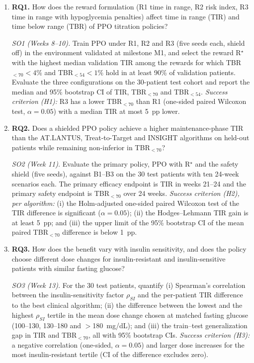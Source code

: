 \documentclass[conference]{IEEEtran}
\begin{document}
\begin{enumerate}[label=\arabic*)]
\item \textbf{RQ1.} How does the reward formulation (R1 time in range, R2 risk index, R3 time in
range with hypoglycemia penalties) affect time in range (TIR) and time below range (TBR) of
PPO titration policies?

\emph{SO1 (Weeks 8--10).} Train PPO under R1, R2 and R3 (five seeds each, shield off) in the
environment validated at milestone M1, and select the reward R$^\star$ with the highest median
validation TIR among the rewards for which TBR$_{<70}<4\%$ and TBR$_{<54}<1\%$ hold in at least
90\% of validation patients. Evaluate the three configurations on the 30-patient test cohort and
report the median and 95\% bootstrap CI of TIR, TBR$_{<70}$ and TBR$_{<54}$. \emph{Success
criterion (H1):} R3 has a lower TBR$_{<70}$ than R1 (one-sided paired Wilcoxon test,
$\alpha=0.05$) with a median TIR at most 5~pp lower.

\item \textbf{RQ2.} Does a shielded PPO policy achieve a higher maintenance-phase TIR than the
AT.LANTUS, Treat-to-Target and INSIGHT algorithms on held-out patients while remaining
non-inferior in TBR$_{<70}$?

\emph{SO2 (Week 11).} Evaluate the primary policy, PPO with R$^\star$ and the safety shield
(five seeds), against B1--B3 on the 30 test patients with ten 24-week scenarios each. The
primary efficacy endpoint is TIR in weeks 21--24 and the primary safety endpoint is TBR$_{<70}$
over 24 weeks. \emph{Success criterion (H2), per algorithm:} (i) the Holm-adjusted one-sided
paired Wilcoxon test of the TIR difference is significant ($\alpha=0.05$); (ii) the
Hodges--Lehmann TIR gain is at least 5~pp; and (iii) the upper limit of the 95\% bootstrap CI of
the mean paired TBR$_{<70}$ difference is below 1~pp.

\item \textbf{RQ3.} How does the benefit vary with insulin sensitivity, and does the policy
choose different dose changes for insulin-resistant and insulin-sensitive patients with similar
fasting glucose?

\emph{SO3 (Week 13).} For the 30 test patients, quantify (i) Spearman's correlation between the
insulin-sensitivity factor $\rho_{SI}$ and the per-patient TIR difference to the best clinical
algorithm; (ii) the difference between the lowest and the highest $\rho_{SI}$ tertile in the mean
dose change chosen at matched fasting glucose (100--130, 130--180 and $>$180~mg/dL); and (iii) the
train--test generalization gap in TIR and TBR$_{<70}$, all with 95\% bootstrap CIs. \emph{Success
criterion (H3):} a negative correlation (one-sided, $\alpha=0.05$) and larger dose increases for
the most insulin-resistant tertile (CI of the difference excludes zero).
\end{enumerate}
\end{document}
